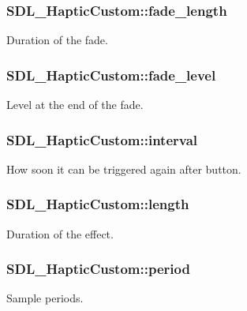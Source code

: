 \subsubsection[{fade\+\_\+length}]{ S\+D\+L\+\_\+\+Haptic\+Custom\+::fade\+\_\+length}\label{structSDL__HapticCustom_ab47fac94baeba28a3acd6c706e0b6a5c}
Duration of the fade. \hypertarget{structSDL__HapticCustom_a73a522581eb514d032e500ec6294fe50}{}
\subsubsection[{fade\+\_\+level}]{ S\+D\+L\+\_\+\+Haptic\+Custom\+::fade\+\_\+level}\label{structSDL__HapticCustom_a73a522581eb514d032e500ec6294fe50}
Level at the end of the fade. \hypertarget{structSDL__HapticCustom_afdeb26b1709254545e00a59a0a6c360c}{}
\subsubsection[{interval}]{ S\+D\+L\+\_\+\+Haptic\+Custom\+::interval}\label{structSDL__HapticCustom_afdeb26b1709254545e00a59a0a6c360c}
How soon it can be triggered again after button. \hypertarget{structSDL__HapticCustom_ad70e8bc2cff74b99d704a757c16b363f}{}
\subsubsection[{length}]{ S\+D\+L\+\_\+\+Haptic\+Custom\+::length}\label{structSDL__HapticCustom_ad70e8bc2cff74b99d704a757c16b363f}
Duration of the effect. \hypertarget{structSDL__HapticCustom_aba7fafa808e90baddef25f009b8f4817}{}
\subsubsection[{period}]{ S\+D\+L\+\_\+\+Haptic\+Custom\+::period}\label{structSDL__HapticCustom_aba7fafa808e90baddef25f009b8f4817}
Sample periods. \hypertarget{structSDL__HapticCustom_a5905ea1b6182da846535ca8c80b4fa33}{}
